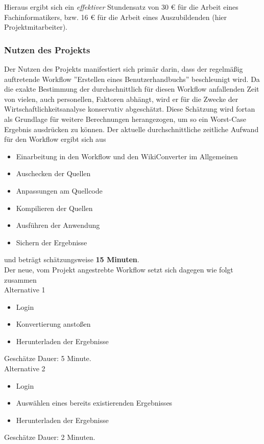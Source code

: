 \documentclass[12pt, xcolor=dvipsnames]{scrartcl}
\begin{document}
Hieraus ergibt sich ein \textit{effektiver} Stundensatz von 30 \euro{} für die Arbeit eines Fachinformatikers, bzw. 16 \euro{} für die Arbeit eines Auszubildenden (hier Projektmitarbeiter).


\subsubsection{Nutzen des Projekts}
\label{sec:nutzen_des_projekts}

Der Nutzen des Projekts manifestiert sich primär darin, dass der regelmäßig auftretende Workflow ''Erstellen eines Benutzerhandbuchs'' beschleunigt wird.
Da die exakte Bestimmung der durchschnittlich für diesen Workflow anfallenden Zeit von vielen, auch personellen, Faktoren abhängt, wird er für die Zwecke der Wirtschaftlichkeitsanalyse konservativ abgeschätzt. Diese Schätzung wird fortan als Grundlage für weitere Berechnungen herangezogen, um so ein Worst-Case Ergebnis ausdrücken zu können.
Der aktuelle durchschnittliche zeitliche Aufwand für den Workflow ergibt sich aus
\begin{itemize}
	\item Einarbeitung in den Workflow und den WikiConverter im Allgemeinen
	\item Auschecken der Quellen
	\item Anpassungen am Quellcode
	\item Kompilieren der Quellen
	\item Ausführen der Anwendung
	\item Sichern der Ergebnisse
\end{itemize}
und beträgt schätzungsweise \textbf{15 Minuten}. \\

Der neue, vom Projekt angestrebte Workflow setzt sich dagegen wie folgt zusammen \\

Alternative 1
\begin{itemize}
	\item Login
	\item Konvertierung anstoßen
	\item Herunterladen der Ergebnisse
\end{itemize}
Geschätze Dauer: 5 Minute. \\

Alternative 2
\begin{itemize}
	\item Login
	\item Auswählen eines bereits existierenden Ergebnisses
	\item Herunterladen der Ergebnisse
\end{itemize}
Geschätze Dauer: 2 Minuten. \\
\end{document}
